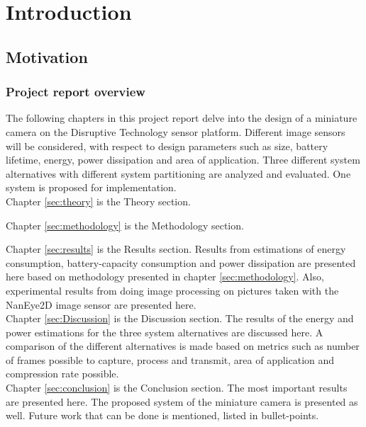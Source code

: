 \newpage
\chapter{Introduction}
\label{sec:introduction}
\section{Motivation}






\newpage
\subsection{Project report overview}
The following chapters in this project report delve into the design of a miniature camera on the Disruptive Technology sensor platform. Different image sensors will be considered, with respect to design parameters such as size, battery lifetime, energy, power dissipation and area of application. Three different system alternatives with different system partitioning are analyzed and evaluated. One system is proposed for implementation.\\  

Chapter \ref{sec:theory} is the Theory section. 


Chapter \ref{sec:methodology} is the Methodology section. 


Chapter \ref{sec:results} is the Results section. Results from estimations of energy consumption, battery-capacity consumption and power dissipation are presented here based on methodology presented in chapter \ref{sec:methodology}. Also, experimental results from doing image processing on pictures taken with the NanEye2D image sensor are presented here. 
\\

Chapter \ref{sec:Discussion} is the Discussion section. The results of the energy and power estimations for the three system alternatives are discussed here. A comparison of the different alternatives is made based on metrics such as number of frames possible to capture, process and transmit, area of application and compression rate possible. 
\\

Chapter \ref{sec:conclusion} is the Conclusion section. The most important results are presented here. The proposed system of the miniature camera is presented as well. Future work that can be done is mentioned, listed in bullet-points. 
\\




